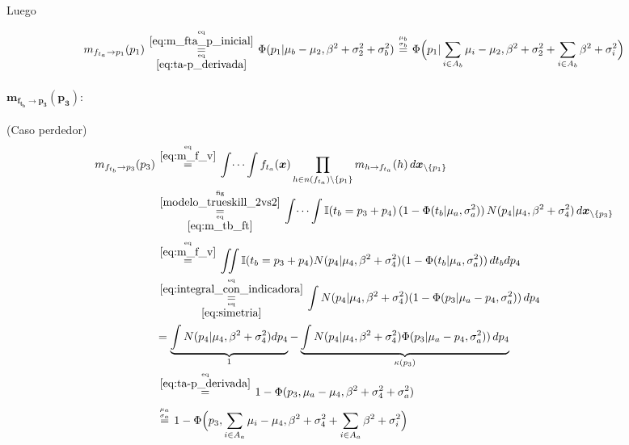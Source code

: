 \documentclass[article]{jss}
\newcommand\hfrac[2]{\genfrac{}{}{0pt}{}{#1}{#2}} %
\begin{document}
Luego

\begin{equation}\label{eq:m_fta_p}
 m_{f_{t_a} \rightarrow p_1}(p_1) \overset{\hfrac{\text{eq}}{\ref{eq:m_fta_p_inicial}}}{\underset{\hfrac{\text{eq}}{\ref{eq:ta-p_derivada}}}{=}}  \Phi(p_1| \mu_b - \mu_2, \beta^2 + \sigma_2^2 + \sigma_b^2)  \overset{\hfrac{\mu_b}{\sigma_b}}{=}  \Phi\Big(p_1| \sum_{i \in A_b} \mu_i - \mu_2, \beta^2 + \sigma_2^2 + \sum_{i \in A_b} \beta^2 + \sigma_i^2 \Big)
\end{equation}

\paragraph{$\bm{m_{f_{t_b} \rightarrow p_3}(p_3)}:$} (Caso perdedor)
\begin{equation}\label{eq:m_ftb_p}
\begin{split}
m_{f_{t_b} \rightarrow p_3}(p_3)&\overset{\hfrac{\text{eq}}{\ref{eq:m_f_v}}}{=} \int \dots \int f_{t_a}(\bm{x}) \prod_{h \in n(f_{t_a}) \setminus \{p_1\} } m_{h \rightarrow f_{t_a}}(h) \, d\bm{x}_{\setminus \{p_1\} }  \\
&\overset{\hfrac{\text{fig}}{\ref{modelo_trueskill_2vs2}}}{\underset{\hfrac{\text{eq}}{\ref{eq:m_tb_ft}}}{=}} \int \dots \int \mathbb{I}( t_b = p_3 + p_4) \, (1-\Phi (t_b| \mu_a , \sigma_a^2 )) \, N(p_4| \mu_4, \beta^2 + \sigma_4^2 ) \, d\bm{x}_{\setminus \{p_3\} }\\[0.1cm]
&\overset{\hfrac{\text{eq}}{\ref{eq:m_f_v}}}{=} \iint \mathbb{I}( t_b = p_3 + p_4) N(p_4| \mu_4, \beta^2 + \sigma_4^2 )  (1 - \Phi (t_b| \mu_a , \sigma_a^2) )\, dt_b dp_4 \\
&\overset{\hfrac{\text{eq}}{\ref{eq:integral_con_indicadora}}}{\underset{\hfrac{\text{eq}}{\ref{eq:simetria}}}{=}} \int N(p_4| \mu_4, \beta^2 + \sigma_4^2 )  (1 - \Phi (p_3 | \mu_a - p_4 , \sigma_a^2 ) ) \,  dp_4 \\
& =  \underbrace{\int N(p_4| \mu_4, \beta^2 + \sigma_4^2 )dp_4}_{1}  -  \underbrace{\int N(p_4| \mu_4, \beta^2 + \sigma_4^2 ) \Phi (p_3 | \mu_a - p_4 , \sigma_a^2 ) ) \, dp_4}_{\kappa(p_3)} \\
&\overset{\hfrac{\text{eq}}{\ref{eq:ta-p_derivada}}}{=} 1 - \Phi(p_3, \mu_a  - \mu_4, \beta^2 + \sigma_4^2 + \sigma_a^2)\\[0.1cm]
&\overset{\hfrac{\mu_a}{\sigma_a}}{=} 1 - \Phi\Big(p_3, \sum_{i \in A_a} \mu_i  - \mu_4, \beta^2 + \sigma_4^2 + \sum_{i \in A_a} \beta^2 + \sigma_i^2  \Big)
\end{split}
\end{equation}
\end{document}
